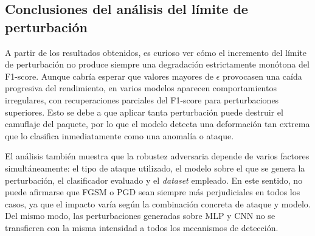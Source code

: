 \subsection{Conclusiones del análisis del límite de perturbación}

A partir de los resultados obtenidos, es curioso ver cómo el incremento del límite de perturbación no produce siempre una degradación estrictamente monótona del F1-score. Aunque cabría esperar que valores mayores de $\epsilon$ provocasen una caída progresiva del rendimiento, en varios modelos aparecen comportamientos irregulares, con recuperaciones parciales del F1-score para perturbaciones superiores. Esto se debe a que aplicar tanta perturbación puede destruir el camuflaje del paquete, por lo que el modelo detecta una deformación tan extrema que lo clasifica inmediatamente como una anomalía o ataque.

El análisis también muestra que la robustez adversaria depende de varios factores simultáneamente: el tipo de ataque utilizado, el modelo sobre el que se genera la perturbación, el clasificador evaluado y el \textit{dataset} empleado. En este sentido, no puede afirmarse que FGSM o PGD sean siempre más perjudiciales en todos los casos, ya que el impacto varía según la combinación concreta de ataque y modelo. Del mismo modo, las perturbaciones generadas sobre MLP y CNN no se transfieren con la misma intensidad a todos los mecanismos de detección.